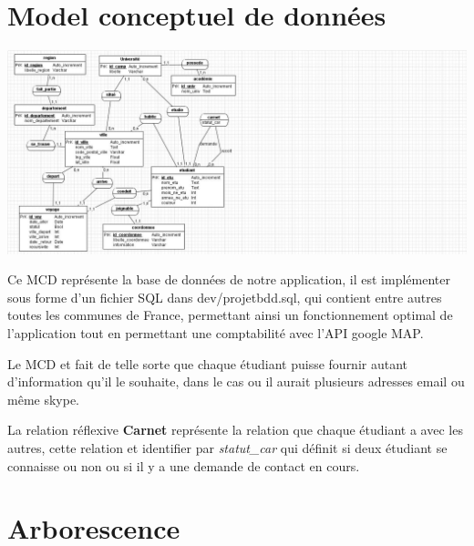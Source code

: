 \documentclass[a4paper,10pt]{report}
\begin{document}
\section{Model conceptuel de donn\'ees}

\begin{center}
    \includegraphics[scale=0.7]{../dev/mcd_covoiturage.jpg}
\end{center}

Ce MCD repr\'esente la base de donn\'ees de notre application, il est impl\'ementer
sous forme d'un fichier SQL dans dev/projetbdd.sql, qui contient entre autres toutes
les communes de France, permettant ainsi un fonctionnement optimal de l'application
tout en permettant une comptabilit\'e avec l'API google MAP.

Le MCD et fait de telle sorte que chaque \'etudiant puisse fournir autant d'information
qu'il le souhaite, dans le cas ou il aurait plusieurs adresses email ou m\^eme skype.

La relation r\'eflexive \textbf{Carnet} repr\'esente la relation que chaque \'etudiant
a avec les autres, cette relation et identifier par \textit{statut\_car} qui d\'efinit 
si deux \'etudiant se connaisse ou non ou si il y a une demande de contact en cours.

\section{Arborescence}
\end{document}
